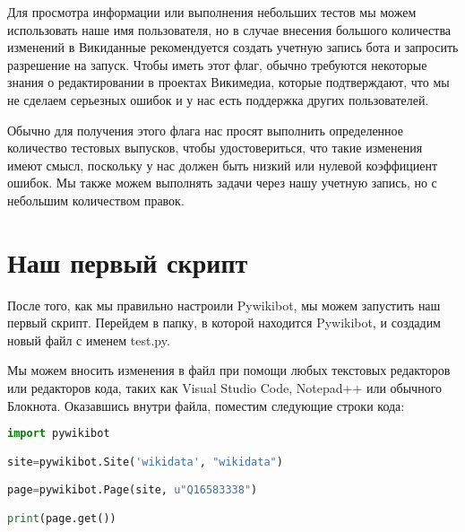 Для просмотра информации или выполнения небольших тестов мы можем использовать наше имя пользователя, но в случае внесения большого количества изменений в Викиданные рекомендуется создать учетную запись бота и запросить разрешение на запуск. Чтобы иметь этот флаг, обычно требуются некоторые знания о редактировании в проектах Викимедиа, которые подтверждают, что мы не сделаем серьезных ошибок и у нас есть поддержка других пользователей.

Обычно для получения этого флага нас просят выполнить определенное количество тестовых выпусков, чтобы удостовериться, что такие изменения имеют смысл, поскольку у нас должен быть низкий или нулевой коэффициент ошибок. Мы также можем выполнять задачи через нашу учетную запись, но с небольшим количеством правок.

\section{Наш первый скрипт}
\label{sec:firstScript}
После того, как мы правильно настроили Pywikibot, мы можем запустить наш первый скрипт. Перейдем в папку, в которой находится Pywikibot, и создадим новый файл с именем test.py.

Мы можем вносить изменения в файл при помощи любых текстовых редакторов или редакторов кода, таких как Visual Studio Code, Notepad++ или обычного Блокнота. Оказавшись внутри файла, поместим следующие строки кода:

\lstset{style=mystyle}
\begin{lstlisting}[language=Python]
import pywikibot

site=pywikibot.Site('wikidata', "wikidata")

page=pywikibot.Page(site, u"Q16583338")

print(page.get())
\end{lstlisting}
